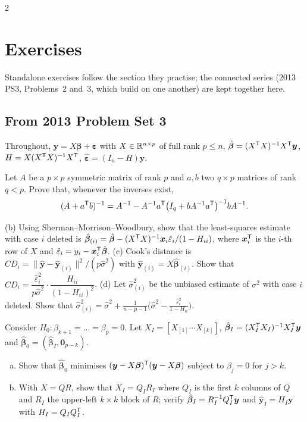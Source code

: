 \begin{paracol}{2}
\section*{Exercises}
Standalone exercises follow the section they practise; the connected series (2013 PS3, Problems~2 and~3, which build on one another) are kept together here.

\subsection*{From 2013 Problem Set 3}
Throughout, $\bm y=X\bm\beta+\bm\varepsilon$ with $X\in\mathbb{R}^{n\times p}$ of full rank $p\le n$, $\hat{\bm\beta}=(X^{\mathsf T} X)^{-1}X^{\mathsf T}\bm y$, $H=X(X^{\mathsf T} X)^{-1}X^{\mathsf T}$,
$\hat{\bm\varepsilon}=(I_n-H)\bm y$.

\begin{exercise}\label{ch05:ex-ps3-2a}
Let $A$ be a $p\times p$ symmetric matrix of rank $p$ and $a,b$ two $q\times p$ matrices of rank $q<p$. Prove that, whenever the
inverses exist,
\[
  (A+a^{\mathsf T} b)^{-1}=A^{-1}-A^{-1}a^{\mathsf T}\bigl(I_q+bA^{-1}a^{\mathsf T}\bigr)^{-1}bA^{-1}.
\]
\end{exercise}

\begin{exercise}\label{ch05:ex-ps3-2bd}
(b) Using Sherman--Morrison--Woodbury, show that the least-squares estimate with case $i$ deleted is
$\hat{\bm\beta}_{(i)}=\hat{\bm\beta}-(X^{\mathsf T} X)^{-1}\bm x_i\hat\varepsilon_i/(1-H_{ii})$, where $\bm x_i^{\mathsf T}$ is the $i$-th row of $X$ and $\hat\varepsilon_i=y_i-\bm x_i^{\mathsf T}\hat{\bm\beta}$.
(c) Cook's distance is $CD_i=\|\hat{\bm y}-\hat{\bm y}_{(i)}\|^2/(p\hat\sigma^2)$ with $\hat{\bm y}_{(i)}=X\hat{\bm\beta}_{(i)}$. Show that
$CD_i=\dfrac{\hat\varepsilon_i^2}{p\hat\sigma^2}\cdot\dfrac{H_{ii}}{(1-H_{ii})^2}$.
(d) Let $\hat\sigma^2_{(i)}$ be the unbiased estimate of $\sigma^2$ with case $i$ deleted. Show that
$\hat\sigma^2_{(i)}=\hat\sigma^2+\frac{1}{n-p-1}\bigl(\hat\sigma^2-\frac{\hat\varepsilon_i^2}{1-H_{ii}}\bigr)$.
\end{exercise}

\begin{exercise}\label{ch05:ex-ps3-3ab}
Consider $H_0:\beta_{k+1}=\dots=\beta_p=0$. Let $X_I=[X_{[1]}\cdots X_{[k]}]$, $\hat{\bm\beta}_I=(X_I^{\mathsf T} X_I)^{-1}X_I^{\mathsf T}\bm y$ and
$\hat{\bm\beta}_0=(\hat{\bm\beta}_I,\bm 0_{p-k})$.
\begin{enumerate}[(a)]
  \item Show that $\hat{\bm\beta}_0$ minimises $(\bm y-X\bm\beta)^{\mathsf T}(\bm y-X\bm\beta)$ subject to $\beta_j=0$ for $j>k$.
  \item With $X=QR$, show that $X_I=Q_IR_I$ where $Q_I$ is the first $k$ columns of $Q$ and $R_I$ the upper-left $k\times k$ block of $R$;
      verify $\hat{\bm\beta}_I=R_I^{-1}Q_I^{\mathsf T}\bm y$ and $\hat{\bm y}_I=H_I\bm y$ with $H_I=Q_IQ_I^{\mathsf T}$.
\end{enumerate}
\end{exercise}


\end{paracol}
